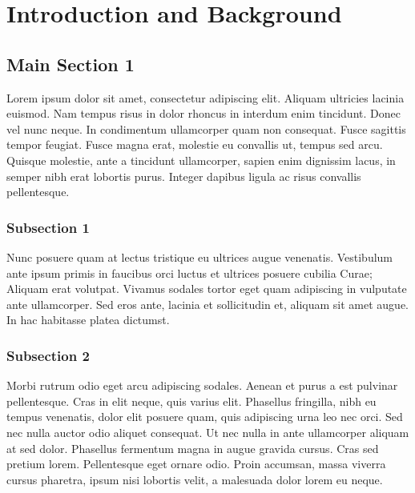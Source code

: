 
\chapter{Introduction and Background} %

\label{Chapter1} %



\section{Main Section 1}

Lorem ipsum dolor sit amet, consectetur adipiscing elit. Aliquam ultricies lacinia euismod. Nam tempus risus in dolor rhoncus in interdum enim tincidunt. Donec vel nunc neque. In condimentum ullamcorper quam non consequat. Fusce sagittis tempor feugiat. Fusce magna erat, molestie eu convallis ut, tempus sed arcu. Quisque molestie, ante a tincidunt ullamcorper, sapien enim dignissim lacus, in semper nibh erat lobortis purus. Integer dapibus ligula ac risus convallis pellentesque.

\subsection{Subsection 1}

Nunc posuere quam at lectus tristique eu ultrices augue venenatis. Vestibulum ante ipsum primis in faucibus orci luctus et ultrices posuere cubilia Curae; Aliquam erat volutpat. Vivamus sodales tortor eget quam adipiscing in vulputate ante ullamcorper. Sed eros ante, lacinia et sollicitudin et, aliquam sit amet augue. In hac habitasse platea dictumst.


\subsection{Subsection 2}
Morbi rutrum odio eget arcu adipiscing sodales. Aenean et purus a est pulvinar pellentesque. Cras in elit neque, quis varius elit. Phasellus fringilla, nibh eu tempus venenatis, dolor elit posuere quam, quis adipiscing urna leo nec orci. Sed nec nulla auctor odio aliquet consequat. Ut nec nulla in ante ullamcorper aliquam at sed dolor. Phasellus fermentum magna in augue gravida cursus. Cras sed pretium lorem. Pellentesque eget ornare odio. Proin accumsan, massa viverra cursus pharetra, ipsum nisi lobortis velit, a malesuada dolor lorem eu neque.

